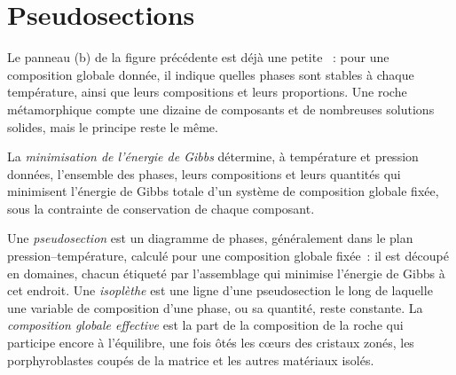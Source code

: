 \section{Pseudosections}\label{sec:b3:petrological-thermodynamics:pseudosections}

Le panneau (b) de la figure précédente est déjà une petite ~: pour une
composition globale donnée, il indique quelles phases sont stables à chaque
température, ainsi que leurs compositions et leurs proportions. Une roche
métamorphique compte une dizaine de composants et de nombreuses solutions solides, mais le principe reste le même.

\begin{definition}\label{def:b3:petrological-thermodynamics:minimisation}
La \emph{minimisation de l'énergie de Gibbs} détermine, à
température et pression données, l'ensemble des phases, leurs compositions et
leurs quantités qui minimisent l'énergie de Gibbs totale d'un système de
composition globale fixée, sous la contrainte de conservation de chaque composant.
\end{definition}

\begin{definition}\label{def:b3:petrological-thermodynamics:pseudosection}
Une \emph{pseudosection} est un diagramme de phases, généralement dans
le plan pression--température, calculé pour une composition globale fixée~: il
est découpé en domaines, chacun étiqueté par l'assemblage qui minimise
l'énergie de Gibbs à cet endroit. Une \emph{isoplèthe}
est une ligne d'une pseudosection le long de laquelle une variable de composition
d'une phase, ou sa quantité, reste constante. La \emph{composition globale
effective} est la part de la composition de la roche qui
participe encore à l'équilibre, une fois ôtés les cœurs des cristaux
zonés, les porphyroblastes coupés de la matrice et les autres matériaux
isolés.
\end{definition}

